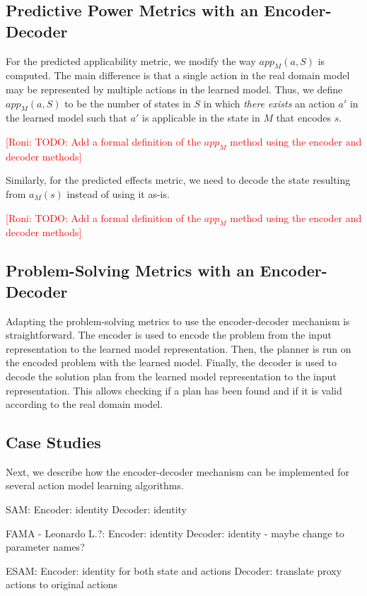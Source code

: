 \documentclass{article}
\theoremstyle{definition}
\theoremstyle{remark}
\newcommand{\app}{\ensuremath{\textit{app}}\xspace}
\newcommand{\roni}[1]{{\textcolor{red}{[Roni: #1]}}}
\begin{document}
\subsection{Predictive Power Metrics with an Encoder-Decoder}
For the predicted applicability metric, we modify the way $\app_M(a,S)$ is computed. The main difference is that a single action in the real domain model may be represented by multiple actions in the learned model. 
Thus, we define 
$\app_M(a,S)$ to be the number of states in $S$ in which \emph{there exists} an action $a'$ in the learned model such that $a'$ is applicable in the state in $M$ that encodes $s$. 

\roni{TODO: Add a formal definition of the $app_M$ method using the encoder and decoder methods}

Similarly, for the predicted effects metric, we need to decode the state resulting from $a_M(s)$ instead of using it as-is. 

\roni{TODO: Add a formal definition of the $app_M$ method using the encoder and decoder methods}

\subsection{Problem-Solving Metrics with an Encoder-Decoder}

Adapting the problem-solving metrics to use the encoder-decoder mechanism is straightforward.
The encoder is used to encode the problem from the input representation to the learned model representation. 
Then, the planner is run on the encoded problem with the learned model. 
Finally, the decoder is used to decode the solution plan from the learned model representation to the input representation. 
This allows checking if a plan has been found and if it is valid according to the real domain model. 


\subsection{Case Studies}
Next, we describe how the encoder-decoder mechanism can be implemented for several action model learning algorithms. 

SAM:
Encoder: identity
Decoder: identity

FAMA - Leonardo L.?:
Encoder: identity
Decoder: identity - maybe change to parameter names?

ESAM:
Encoder: identity for both state and actions     
Decoder: translate proxy actions to original actions
\end{document}
